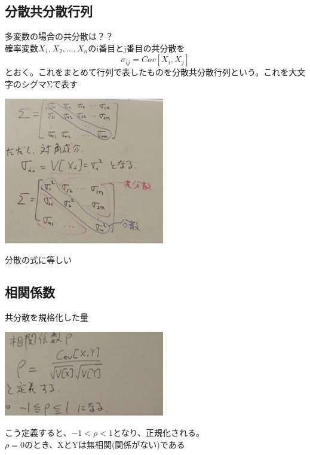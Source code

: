 \documentclass{jsarticle}
\begin{document}
	\subsection{分散共分散行列}
	多変数の場合の共分散は？？\\
	確率変数$X_1,X_2,...,X_n$のi番目とj番目の共分散を
	\[
		σ_{ij}=Cov[X_i,X_j]
	\]
	とおく。これをまとめて行列で表したものを分散共分散行列という。これを大文字のシグマΣで表す\\
	\begin{center}
		\includegraphics[width=7cm]{11_30_C5.JPG}
	\end{center}
	分散の式に等しい
	\subsection{相関係数}
	共分散を規格化した量\\
	\begin{center}
		\includegraphics[width=7cm]{11_30_C6.JPG}
	\end{center}
	こう定義すると、$-1<ρ<1$となり、正規化される。\\
	$ρ=0$のとき、XとYは無相関(関係がない)である\\
\end{document}
